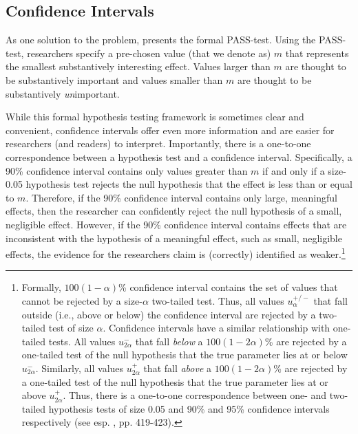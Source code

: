 \documentclass[12pt]{article}
\begin{document}
\subsection*{Confidence Intervals}

As one solution to the problem, \cite{Gross2014} presents the formal PASS-test. Using the PASS-test, researchers specify a pre-chosen value (that we denote as) $m$ that represents the smallest substantively interesting effect. Values larger than $m$ are thought to be substantively important and values smaller than $m$ are thought to be substantively \textit{un}important. 

While this formal hypothesis testing framework is sometimes clear and convenient, confidence intervals offer even more information and are easier for researchers (and readers) to interpret. Importantly, there is a one-to-one correspondence between a hypothesis test and a confidence interval. Specifically, a 90\% confidence interval contains only values greater than $m$ if and only if a size-0.05 hypothesis test rejects the null hypothesis that the effect is less than or equal to $m$. Therefore, if the 90\% confidence interval contains only large, meaningful effects, then the researcher can confidently reject the null hypothesis of a small, negligible effect. However, if the 90\% confidence interval contains effects that are inconsistent with the hypothesis of a meaningful effect, such as small, negligible effects, the evidence for the researchers claim is (correctly) identified as weaker.\footnote{
Formally, $100(1-\alpha)$\% confidence interval contains the set of values that cannot be rejected by a size-$\alpha$ two-tailed test. Thus, all values $u^{+/-}_{\alpha}$ that fall outside (i.e., above or below) the confidence interval are rejected by a two-tailed test of size $\alpha$. Confidence intervals have a similar relationship with one-tailed tests. All values $u^{-}_{2\alpha}$ that fall \textit{below} a $100(1-2\alpha)$\% are rejected by a one-tailed test of the null hypothesis that the true parameter lies at or below $u^{-}_{2\alpha}$. Similarly, all values $u^{+}_{2\alpha}$ that fall \textit{above} a $100(1-2\alpha)$\% are rejected by a one-tailed test of the null hypothesis that the true parameter lies at or above $u^{+}_{2\alpha}$. Thus, there is a one-to-one correspondence between one- and two-tailed hypothesis tests of size 0.05 and 90\% and 95\% confidence intervals respectively (see esp. \citealt{CasellaBerger2002}, pp. 419-423).
}
\end{document}

